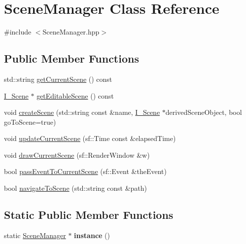\hypertarget{class_scene_manager}{}\section{Scene\+Manager Class Reference}
\label{class_scene_manager}


{\ttfamily \#include $<$Scene\+Manager.\+hpp$>$}

\subsection*{Public Member Functions}
\begin{DoxyCompactItemize}
\item 
std\+::string \hyperlink{class_scene_manager_a77bd9095429893110454ccd716a9fff5}{get\+Current\+Scene} () const 
\item 
\hyperlink{class_i___scene}{I\+\_\+\+Scene} $\ast$ \hyperlink{class_scene_manager_a618fb8cab23a252b98c66a3ef27147ca}{get\+Editable\+Scene} () const 
\item 
void \hyperlink{class_scene_manager_a2c5918c732cedd929db77c37da2bf3b5}{create\+Scene} (std\+::string const \&name, \hyperlink{class_i___scene}{I\+\_\+\+Scene} $\ast$derived\+Scene\+Object, bool go\+To\+Scene=true)
\item 
void \hyperlink{class_scene_manager_a95303770a6b44a29e137605c46b777e7}{update\+Current\+Scene} (sf\+::\+Time const \&elapsed\+Time)
\item 
void \hyperlink{class_scene_manager_a1d3facb4a9f1e172c30fc1981cde325c}{draw\+Current\+Scene} (sf\+::\+Render\+Window \&w)
\item 
bool \hyperlink{class_scene_manager_a8540e64a3c1c0d369b853ff393b59822}{pass\+Event\+To\+Current\+Scene} (sf\+::\+Event \&the\+Event)
\item 
bool \hyperlink{class_scene_manager_abe3f30d22a5a781e719d2fc881f00ef3}{navigate\+To\+Scene} (std\+::string const \&path)
\end{DoxyCompactItemize}
\subsection*{Static Public Member Functions}
\begin{DoxyCompactItemize}
\item 
\hypertarget{class_scene_manager_a4b597c83770eced37c85eda6a5664c89}{}static \hyperlink{class_scene_manager}{Scene\+Manager} $\ast$ {\bfseries instance} ()\label{class_scene_manager_a4b597c83770eced37c85eda6a5664c89}

\end{DoxyCompactItemize}
